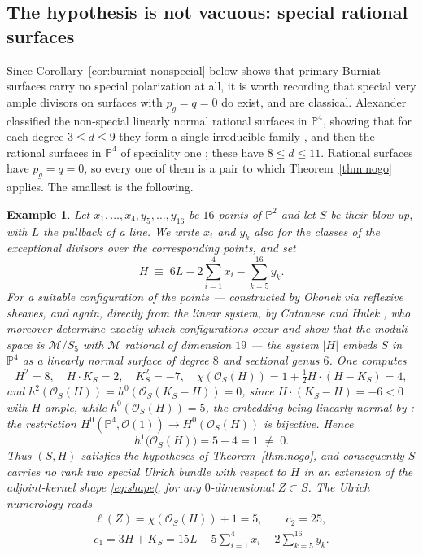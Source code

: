 \documentclass[10pt,a4paper]{amsart}
\newtheorem{example}[theorem]{Example}
\newcommand{\OO}{\mathcal{O}}
\newcommand{\PP}{\mathbb{P}}
\newcommand{\len}{\ell}
\begin{document}
\subsection{The hypothesis is not vacuous: special rational surfaces}\label{subsec:special-rational}
Since Corollary~\ref{cor:burniat-nonspecial} below shows that primary Burniat surfaces carry no special polarization at all, it is worth recording that special very ample divisors on surfaces with $p_g=q=0$ do exist, and are classical. Alexander classified the non-special linearly normal rational surfaces in $\PP^4$, showing that for each degree $3\le d\le9$ they form a single irreducible family \cite{Al88}, and then the rational surfaces in $\PP^4$ of speciality one \cite{Al92}; these have $8\le d\le11$. Rational surfaces have $p_g=q=0$, so every one of them is a pair to which Theorem~\ref{thm:nogo} applies. The smallest is the following.

\begin{example}\label{ex:special-rational}
Let $x_1,\dots,x_4,y_5,\dots,y_{16}$ be $16$ points of $\PP^2$ and let $S$ be their blow up, with $L$ the pullback of a line. We write $x_i$ and $y_k$ also for the classes of the exceptional divisors over the corresponding points, and set
\[
H\;\equiv\;6L-2\sum_{i=1}^{4}x_i-\sum_{k=5}^{16}y_k .
\]
For a suitable configuration of the points --- constructed by Okonek \cite{Ok86} via reflexive sheaves, and again, directly from the linear system, by Catanese and Hulek \cite[Thm.~III.17]{CH97}, who moreover determine exactly which configurations occur \cite[Thm.~III.14]{CH97} and show that the moduli space is $\mathcal M/S_5$ with $\mathcal M$ rational of dimension $19$ \cite[Thm.~III.20]{CH97} --- the system $|H|$ embeds $S$ in $\PP^4$ as a linearly normal surface of degree $8$ and sectional genus $6$. One computes
\[
H^2=8,\quad H\cdot K_S=2,\quad K_S^2=-7,\quad \chi(\OO_S(H))=1+\tfrac12H\cdot(H-K_S)=4,
\]
and $h^2(\OO_S(H))=h^0(\OO_S(K_S-H))=0$, since $H\cdot(K_S-H)=-6<0$ with $H$ ample, while $h^0(\OO_S(H))=5$, the embedding being linearly normal by \cite[Thm.~III.17]{CH97}: the restriction $H^0(\PP^4,\OO(1))\to H^0(\OO_S(H))$ is bijective. Hence
\[
h^1\bigl(\OO_S(H)\bigr)=5-4=1\;\neq\;0 .
\]
Thus $(S,H)$ satisfies the hypotheses of Theorem~\ref{thm:nogo}, and consequently $S$ carries no rank two special Ulrich bundle with respect to $H$ in an extension of the adjoint-kernel shape \eqref{eq:shape}, for any $0$-dimensional $Z\subset S$. The Ulrich numerology reads
\[
\begin{gathered}
\len(Z)=\chi(\OO_S(H))+1=5,\qquad c_2=25,\\
c_1=3H+K_S=15L-5\textstyle\sum_{i=1}^{4} x_i-2\sum_{k=5}^{16} y_k .
\end{gathered}
\]
\end{example}
\end{document}
